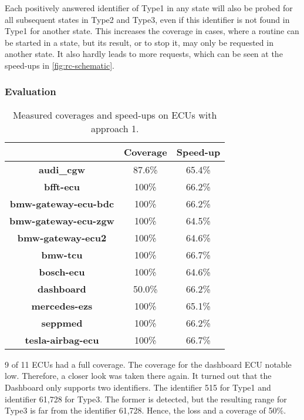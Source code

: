 Each positively answered identifier of Type1 in any state will also be probed for all subsequent states in Type2 and Type3, even if this identifier is not found in Type1 for another state. This increases the coverage in cases, where a routine can be started in a state, but its result, or to stop it, may only be requested in another state. It also hardly leads to more requests, which can be seen at the speed-ups in \autoref{fig:rc-schematic}.


\subsubsection{Evaluation}

\begin{table}[h]
    \begin{center}
    \begin{tabular}{ccc}
        \hline
        & \textbf{Coverage} & \textbf{Speed-up} \\
        \hline
        \textbf{audi\_cgw} & 87.6\% & 65.4\% \\
        \textbf{bfft-ecu} & 100\% & 66.2\% \\
        \textbf{bmw-gateway-ecu-bdc} & 100\% & 66.2\% \\
        \textbf{bmw-gateway-ecu-zgw} & 100\% & 64.5\% \\
        \textbf{bmw-gateway-ecu2} & 100\% & 64.6\% \\
        \textbf{bmw-tcu} & 100\% & 66.7\% \\
        \textbf{bosch-ecu} & 100\% & 64.6\% \\
        \textbf{dashboard} & 50.0\% & 66.2\% \\
        \textbf{mercedes-ezs} & 100\% & 65.1\% \\
        \textbf{seppmed} & 100\% & 66.2\% \\
        \textbf{tesla-airbag-ecu} & 100\% & 66.7\% \\
        \hline

    \end{tabular}
    \end{center}
    \caption{Measured coverages and speed-ups on ECUs with approach 1.}
    \label{tab:evaluation-approach1}
\end{table}

9 of 11 ECUs had a full coverage. The coverage for the dashboard ECU notable low. Therefore, a closer look was taken there again. It turned out that the Dashboard only supports two identifiers. The identifier 515 for Type1 and identifier 61,728 for Type3. The former is detected, but the resulting range for Type3 is far from the identifier 61,728. Hence, the loss and a coverage of 50\%.

